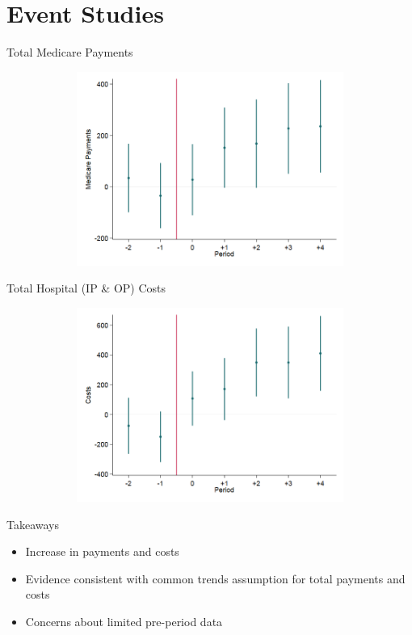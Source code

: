 \documentclass[t,aspectratio=169]{beamer}
\begin{document}
\section{Event Studies}
\begin{frame}{Total Medicare Payments}
    \begin{figure}
        \centering
        \includegraphics[height=2.5in,width=5in,keepaspectratio]{EventPay_All_2011}
    \end{figure}
\end{frame}

\begin{frame}{Total Hospital (IP \& OP) Costs}
    \begin{figure}
        \centering
        \includegraphics[height=2.5in,width=5in,keepaspectratio]{EventCharge_All_2011}
    \end{figure}
\end{frame}

\begin{frame}{Takeaways}
    \begin{itemize}
        \item Increase in payments and costs
        \item Evidence consistent with common trends assumption for total payments and costs
        \item Concerns about limited pre-period data
    \end{itemize}
\end{frame}
\end{document}
